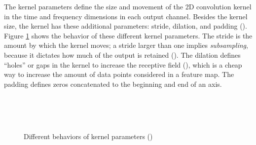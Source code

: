 \documentclass[report.tex]{subfiles}
\begin{document}
The kernel parameters define the size and movement of the 2D convolution kernel in the time and frequency dimensions in each output channel. Besides the kernel size, the kernel has these additional parameters: stride, dilation, and padding (\cite{convguide}). Figure \ref{fig:convdiags} shows the behavior of these different kernel parameters. The stride is the amount by which the kernel moves; a stride larger than one implies \textit{subsampling}, because it dictates how much of the output is retained (\cite{convguide}). The dilation defines ``holes'' or gaps in the kernel to increase the receptive field (\cite{convguide}), which is a cheap way to increase the amount of data points considered in a feature map. The padding defines zeros concatenated to the beginning and end of an axis.

\begin{figure}[ht]
	\centering
	\\
	\\
	\\
	\caption{Different behaviors of kernel parameters (\cite[14, 29]{convguide})}
	\label{fig:convdiags}
\end{figure}
\end{document}
